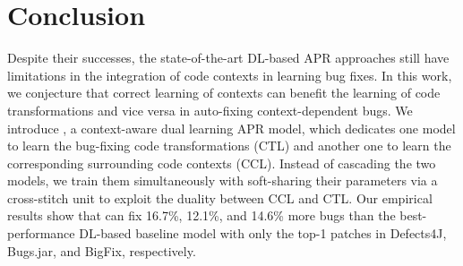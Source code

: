\section{Conclusion}

Despite their successes, the state-of-the-art DL-based APR approaches
still have limitations in the integration of code contexts in learning
bug fixes. In this work, we conjecture that correct learning of
contexts can benefit the learning of code transformations and vice
versa in auto-fixing context-dependent bugs. We introduce {\tool}, a
context-aware dual learning APR model, which dedicates one model to
learn the bug-fixing code transformations (CTL) and another one to
learn the corresponding surrounding code contexts (CCL). Instead of
cascading the two models, we train them simultaneously with
soft-sharing their parameters via a cross-stitch unit to exploit the
duality between CCL and CTL.
Our empirical results show that {\tool} can fix 16.7\%, 12.1\%, and
14.6\% more bugs than the best-performance DL-based baseline model
with only the top-1 patches in Defects4J, Bugs.jar, and BigFix,
respectively.
